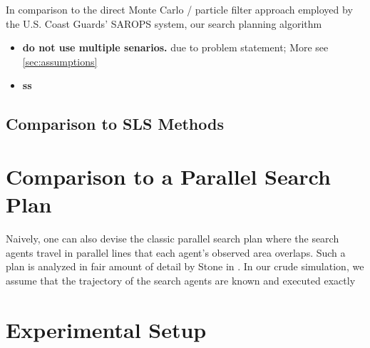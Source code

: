 \documentclass[12pt, letterpaper]{article}  %
\theoremstyle{definition}
\theoremstyle{remark}
\theoremstyle{plain}
\begin{document}
In comparison to the direct Monte Carlo / particle filter approach employed by the U.S. Coast Guards' SAROPS system, our search planning algorithm
\begin{itemize}
	\item \textbf{do not use multiple senarios.} due to problem statement; More see \ref{sec:assumptions}
	\item \textbf{ss}
\end{itemize}


\subsection{Comparison to SLS Methods}\label{subsec:newer}




\section{Comparison to a Parallel Search Plan}\label{sec:greedyalg}


Naively, one can also devise the classic parallel search plan where the search agents travel in parallel lines that each agent's observed area overlaps. Such a plan is analyzed in fair amount of detail by Stone in \cite{83stone}. In our crude simulation, we assume that the trajectory of the search agents are known and executed exactly






%
%
%
%
%
%
%


\section{Experimental Setup}\label{sec:experiment}
\end{document}
